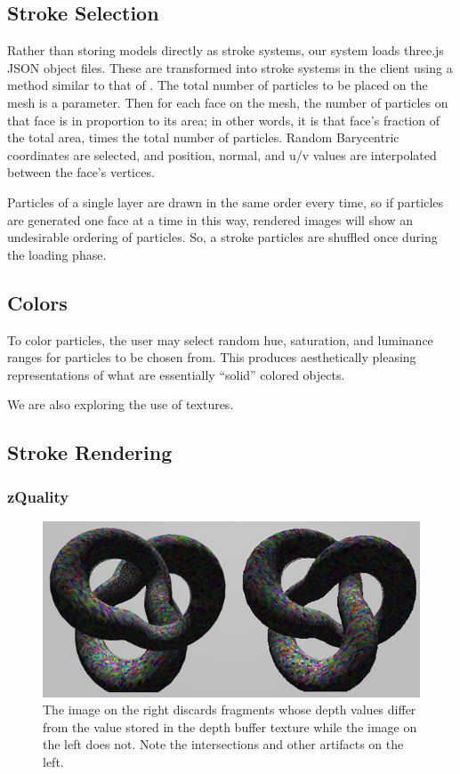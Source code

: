 \documentclass[conference]{acmsiggraph}
\begin{document}
\subsection{Stroke Selection}

Rather than storing models directly as stroke systems, our system loads
three.js JSON object files. These are transformed into stroke systems in the
client using a method similar to that of \cite{Meier:1996:PRA:237170.237288}.
The total number of particles to be placed on the mesh is a parameter. Then for
each face on the mesh, the number of particles on that face is in proportion to
its area; in other words, it is that face's fraction of the total area, times
the total number of particles. Random Barycentric coordinates are selected, and
position, normal, and u/v values are interpolated between the face's vertices.

Particles of a single layer are drawn in the same order every time, so if
particles are generated one face at a time in this way, rendered images will
show an undesirable ordering of particles. So, a stroke particles are shuffled
once during the loading phase.


\subsection{Colors}

To color particles, the user may select random hue, saturation, and luminance
ranges for particles to be chosen from. This produces aesthetically pleasing
representations of what are essentially ``solid'' colored objects.

We are also exploring the use of textures.


\subsection{Stroke Rendering}

\subsubsection{zQuality}

\begin{figure}[ht] %
  \centering
  \includegraphics[width=6.0in]{images/torus_depth_test_demo}
  \caption{The image on the right discards fragments whose depth values differ
           from the value stored in the depth buffer texture while the image on
           the left does not. Note the intersections and other artifacts on the
           left.}
\end{figure}
\end{document}
